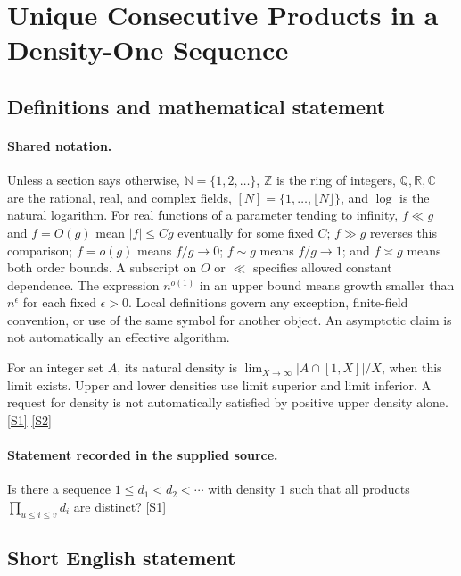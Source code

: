 \documentclass[11pt,a4paper]{article}
\newcommand{\N}{\mathbb{N}}
\newcommand{\Z}{\mathbb{Z}}
\newcommand{\Q}{\mathbb{Q}}
\newcommand{\R}{\mathbb{R}}
\newcommand{\C}{\mathbb{C}}
\newcommand{\sref}[2]{\hyperlink{source:#1:#2}{[S#2]}}
\begin{document}
\section{Unique Consecutive Products in a Density-One Sequence}\label{statement}


\subsection{Definitions and mathematical statement}

\paragraph{Shared notation.}Unless a section says otherwise, $\N=\{1,2,\ldots\}$,
$\Z$ is the ring of integers, $\Q,\R,\C$ are the rational, real, and complex
fields, $[N]=\{1,\ldots,\lfloor N\rfloor\}$, and $\log$ is the natural
logarithm. For real functions of a parameter tending to infinity,
$f\ll g$ and $f=O(g)$ mean $|f|\leq Cg$ eventually for some fixed $C$;
$f\gg g$ reverses this comparison; $f=o(g)$ means $f/g\to0$;
$f\sim g$ means $f/g\to1$; and $f\asymp g$ means both order bounds.
A subscript on $O$ or $\ll$ specifies allowed constant dependence.
The expression $n^{o(1)}$ in an upper bound means growth smaller than
$n^\epsilon$ for each fixed $\epsilon>0$. Local definitions govern any
exception, finite-field convention, or use of the same symbol for another
object. An asymptotic claim is not automatically an effective algorithm.



For an integer set $A$, its natural density is $\lim_{X\to\infty}|A\cap[1,X]|/X$, when this limit exists. Upper and lower densities use limit superior and limit inferior. A request for density is not automatically satisfied by positive upper density alone. \sref{statement}{1} \sref{statement}{2}

\paragraph{Statement recorded in the supplied source.}
Is there a sequence $1\leq d_1<d_2<\cdots$ with density $1$ such that all products $\prod_{u\leq i\leq v}d_i$ are distinct? \sref{statement}{1}

\subsection{Short English statement}
\end{document}
